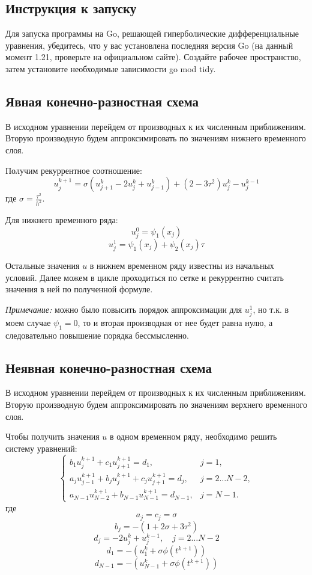 \documentclass{article}
\begin{document}
\subsection*{Инструкция к запуску}
Для запуска программы на Go, решающей гиперболические дифференциальные уравнения, убедитесь, что у вас установлена последняя версия Go 
(на данный момент 1.21, проверьте на официальном сайте). Создайте рабочее пространство, затем установите необходимые зависимости go mod tidy.

\pagebreak

\subsection*{Явная конечно-разностная схема}

В исходном уравнении перейдем от производных к их численным приближениям. Вторую производную будем аппроксимировать
по значениям нижнего временного слоя.

Получим рекуррентное соотношение:
\[
u_{j}^{k+1} = \sigma \left( u_{j+1}^{k} - 2u_{j}^{k} + u_{j-1}^{k} \right) + \left( 2 - 3\tau^2 \right)u_{j}^{k} - u_{j}^{k-1}
\]
где \(\sigma = \frac{\tau^2}{h^2}\).

Для нижнего временного ряда:
\[
u_{j}^{0} = \psi_1(x_j)
\]
\[
u_{j}^{1} = \psi_1(x_j) + \psi_2(x_j)\tau
\]

Остальные значения \( u \) в нижнем временном ряду известны из начальных условий. Далее можем в цикле проходиться по сетке и
рекуррентно считать значения в ней по полученной формуле.

\textit{Примечание:} можно было повысить порядок аппроксимации для \( u_{j}^{1} \), но т.к. в моем случае \(\psi_1 = 0\), то и вторая производная
от нее будет равна нулю, а следовательно повышение порядка бессмысленно.


\subsection*{Неявная конечно-разностная схема}

В исходном уравнении перейдем от производных к их численным приближениям. Вторую производную будем аппроксимировать
по значениям верхнего временного слоя.

Чтобы получить значения \( u \) в одном временном ряду, необходимо решить систему уравнений:
\[
\begin{cases}
b_1u_{j}^{k+1} + c_1u_{j+1}^{k+1} = d_1, & j = 1, \\
a_ju_{j-1}^{k+1} + b_ju_{j}^{k+1} + c_ju_{j+1}^{k+1} = d_j, & j = 2 \ldots N - 2, \\
a_{N-1}u_{N-2}^{k+1} + b_{N-1}u_{N-1}^{k+1} = d_{N-1}, & j = N - 1.
\end{cases}
\]
где
\[
a_j = c_j = \sigma
\]
\[
b_j = -(1 + 2\sigma + 3\tau^2)
\]
\[
d_j = -2u_{j}^{k} + u_{j}^{k-1}, \quad j = 2 \ldots N - 2
\]
\[
d_1 = -(u_{1}^{k} + \sigma \phi(t^{k+1}))
\]
\[
d_{N-1} = -(u_{N-1}^{k} + \sigma \phi(t^{k+1}))
\]
\end{document}
